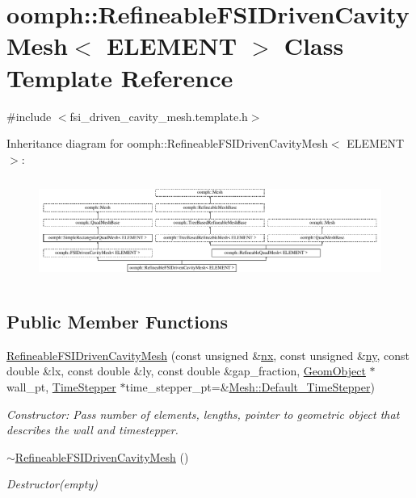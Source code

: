 \hypertarget{classoomph_1_1RefineableFSIDrivenCavityMesh}{}\section{oomph\+:\+:Refineable\+F\+S\+I\+Driven\+Cavity\+Mesh$<$ E\+L\+E\+M\+E\+NT $>$ Class Template Reference}
\label{classoomph_1_1RefineableFSIDrivenCavityMesh}


{\ttfamily \#include $<$fsi\+\_\+driven\+\_\+cavity\+\_\+mesh.\+template.\+h$>$}

Inheritance diagram for oomph\+:\+:Refineable\+F\+S\+I\+Driven\+Cavity\+Mesh$<$ E\+L\+E\+M\+E\+NT $>$\+:\begin{figure}[H]
\begin{center}
\leavevmode
\includegraphics[height=3.404255cm]{classoomph_1_1RefineableFSIDrivenCavityMesh}
\end{center}
\end{figure}
\subsection*{Public Member Functions}
\begin{DoxyCompactItemize}
\item 
\hyperlink{classoomph_1_1RefineableFSIDrivenCavityMesh_a91c0ab00784098cb0e583ab0882b0e0e}{Refineable\+F\+S\+I\+Driven\+Cavity\+Mesh} (const unsigned \&\hyperlink{classoomph_1_1SimpleRectangularQuadMesh_a4ff7678ec433180e2245ea2147f222b7}{nx}, const unsigned \&\hyperlink{classoomph_1_1SimpleRectangularQuadMesh_a45011f22dedd480392b1f376e4269921}{ny}, const double \&lx, const double \&ly, const double \&gap\+\_\+fraction, \hyperlink{classoomph_1_1GeomObject}{Geom\+Object} $\ast$wall\+\_\+pt, \hyperlink{classoomph_1_1TimeStepper}{Time\+Stepper} $\ast$time\+\_\+stepper\+\_\+pt=\&\hyperlink{classoomph_1_1Mesh_a12243d0fee2b1fcee729ee5a4777ea10}{Mesh\+::\+Default\+\_\+\+Time\+Stepper})
\begin{DoxyCompactList}\small\item\em Constructor\+: Pass number of elements, lengths, pointer to geometric object that describes the wall and timestepper. \end{DoxyCompactList}\item 
\hyperlink{classoomph_1_1RefineableFSIDrivenCavityMesh_a01e9f73b3d9344b6df2aeda2c57de628}{$\sim$\+Refineable\+F\+S\+I\+Driven\+Cavity\+Mesh} ()
\begin{DoxyCompactList}\small\item\em Destructor(empty) \end{DoxyCompactList}\end{DoxyCompactItemize}
